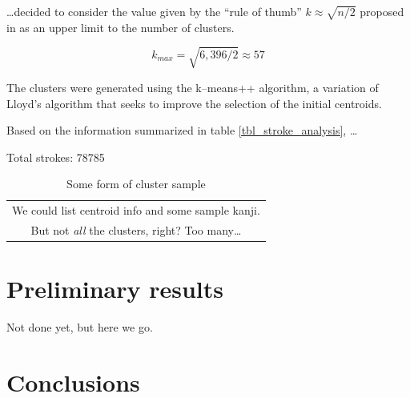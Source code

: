\documentclass[10pt,conference,a4paper]{IEEEtran}
\begin{document}
	\ldots decided to consider the value given by the ``rule of thumb'' $k \approx \sqrt{n / 2}$ proposed in \cite{mardia2005multivariate}
	as an upper limit to the number of clusters.

	$$ k_{max} = \sqrt{6,396 / 2} \approx 57 $$

	The clusters were generated using the k--means++ algorithm,
	a variation of Lloyd's algorithm that seeks to improve the selection of the initial centroids. \cite{arthur2007k}

	Based on the information summarized in table \ref{tbl_stroke_analysis}, \ldots

	Total strokes: 78785

	\begin{table}
		\renewcommand{\arraystretch}{1.3}
		\caption{Some form of cluster sample}
		\label{tbl_sample_clusters}
		\centering
		\begin{tabular}{c}
			We could list centroid info and some sample kanji. \\
			But not \emph{all} the clusters, right? Too many\ldots \\
		\end{tabular}
	\end{table}





	\section{Preliminary results}

	Not done yet, but here we go.


	\section{Conclusions}
\end{document}
